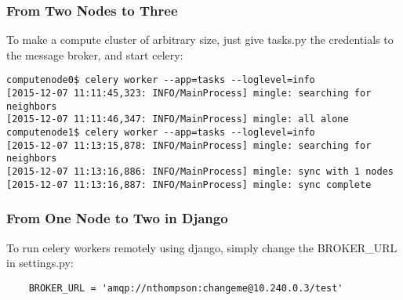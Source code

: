 \documentclass[9pt]{beamer}
\begin{document}
\begin{frame}[fragile]
  \frametitle{From Two Nodes to Three}
  To make a compute cluster of arbitrary size, just give tasks.py the credentials to the message broker, and start celery:
  \begin{verbatim}
computenode0$ celery worker --app=tasks --loglevel=info
[2015-12-07 11:11:45,323: INFO/MainProcess] mingle: searching for neighbors
[2015-12-07 11:11:46,347: INFO/MainProcess] mingle: all alone
computenode1$ celery worker --app=tasks --loglevel=info
[2015-12-07 11:13:15,878: INFO/MainProcess] mingle: searching for neighbors
[2015-12-07 11:13:16,886: INFO/MainProcess] mingle: sync with 1 nodes
[2015-12-07 11:13:16,887: INFO/MainProcess] mingle: sync complete
  \end{verbatim}
\end{frame}

\begin{frame}[fragile]
  \frametitle{From One Node to Two in Django}
  To run celery workers remotely using django, simply change the BROKER\_URL in settings.py:
  \begin{verbatim}
    BROKER_URL = 'amqp://nthompson:changeme@10.240.0.3/test'
  \end{verbatim}
\end{frame}
\end{document}

